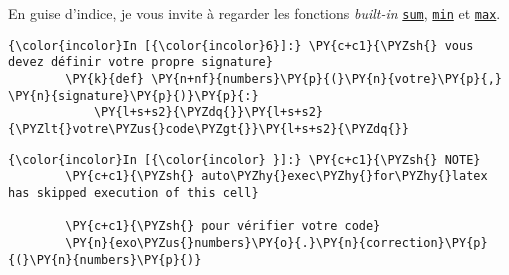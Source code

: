     En guise d'indice, je vous invite à regarder les fonctions
\emph{built-in}
\href{https://docs.python.org/3/library/functions.html\#sum}{\texttt{sum}},
\href{https://docs.python.org/3/library/functions.html\#min}{\texttt{min}}
et
\href{https://docs.python.org/3/library/functions.html\#max}{\texttt{max}}.

    \begin{Verbatim}[commandchars=\\\{\}]
{\color{incolor}In [{\color{incolor}6}]:} \PY{c+c1}{\PYZsh{} vous devez définir votre propre signature}
        \PY{k}{def} \PY{n+nf}{numbers}\PY{p}{(}\PY{n}{votre}\PY{p}{,} \PY{n}{signature}\PY{p}{)}\PY{p}{:}
            \PY{l+s+s2}{\PYZdq{}}\PY{l+s+s2}{\PYZlt{}votre\PYZus{}code\PYZgt{}}\PY{l+s+s2}{\PYZdq{}}
\end{Verbatim}


    \begin{Verbatim}[commandchars=\\\{\}]
{\color{incolor}In [{\color{incolor} }]:} \PY{c+c1}{\PYZsh{} NOTE}
        \PY{c+c1}{\PYZsh{} auto\PYZhy{}exec\PYZhy{}for\PYZhy{}latex has skipped execution of this cell}
        
        \PY{c+c1}{\PYZsh{} pour vérifier votre code}
        \PY{n}{exo\PYZus{}numbers}\PY{o}{.}\PY{n}{correction}\PY{p}{(}\PY{n}{numbers}\PY{p}{)}
\end{Verbatim}



    
    
    

